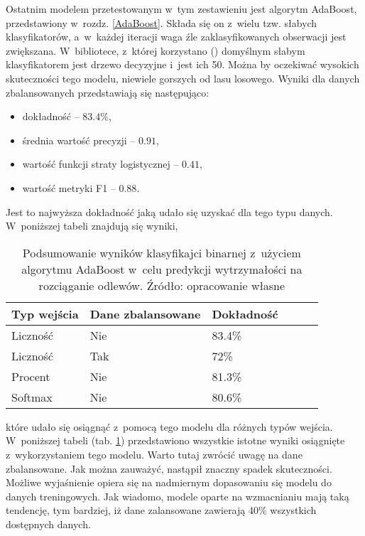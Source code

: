 Ostatnim modelem przetestowanym w~tym zestawieniu jest algorytm AdaBoost, przedstawiony w~rozdz. \ref{AdaBoost}. Składa się on z~wielu tzw. słabych klasyfikatorów, a~w~każdej iteracji waga źle zaklasyfikowanych obserwacji jest zwiększana. W~bibliotece, z~której korzystano () domyślnym słabym klasyfikatorem jest drzewo decyzyjne i~jest ich 50. Można by oczekiwać wysokich skuteczności tego modelu, niewiele gorszych od lasu losowego. 
Wyniki dla danych zbalansowanych przedstawiają się następująco:
\begin{itemize}
	\item dokładność – $83.4\%$,
	\item średnia wartość precyzji – $0.91$,
	\item wartość funkcji straty logistycznej – $0.41$,
	\item wartość metryki F1 – $0.88$.
\end{itemize}
Jest to najwyższa dokładność jaką udało się uzyskać dla tego typu danych. W~poniższej tabeli znajdują się wyniki, 
\begin{table}[!h]
	\centering
	\begin{threeparttable}
		\caption{Podsumowanie wyników klasyfikajci binarnej z~użyciem algorytmu AdaBoost w~celu predykcji wytrzymałości na rozciąganie odlewów. Źródło: opracowanie własne}
		\label{ada.summary.table}
		\begin{tabularx}{1\textwidth}{ |X|X|X|X|X|X| }
		  \hline
		  \textbf{Typ wejścia} & \textbf{Dane zbalansowane} & \textbf{Dokładność}  \\
		  \hline

	          Liczność & Nie & 83.4\%\\
		  \hline

	          Liczność & Tak & 72\%\\
		  \hline

	          Procent & Nie & 81.3\%\\
		  \hline

	          Softmax & Nie & 80.6\%\\
		  \hline
		\end{tabularx}
	\end{threeparttable}
\end{table}
które udało się osiągnąć z~pomocą tego modelu dla różnych typów wejścia. W~poniższej tabeli (tab. \ref{ada.summary.table}) przedstawiono wszystkie istotne wyniki osiągnięte z~wykorzystaniem tego modelu.
Warto tutaj zwrócić uwagę na dane zbalansowane. Jak można zauważyć, nastąpił znaczny spadek skuteczności. Możliwe wyjaśnienie opiera się na nadmiernym dopasowaniu się modelu do danych treningowych. Jak wiadomo, modele oparte na wzmacnianiu mają taką tendencję, tym bardziej, iż dane zalansowane zawierają 40\% wszystkich dostępnych danych.


